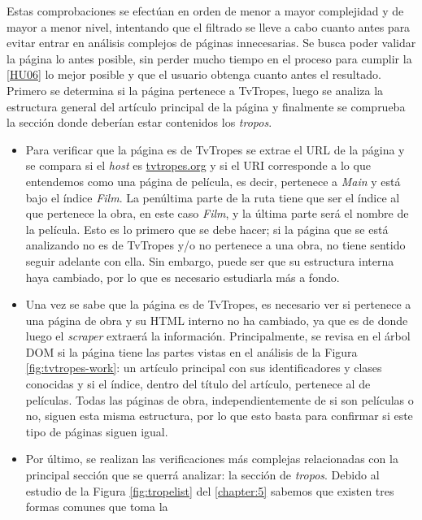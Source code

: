 Estas comprobaciones se efectúan en orden de menor a mayor complejidad y de
mayor a menor nivel, intentando que el filtrado se lleve a cabo cuanto antes
para evitar entrar en análisis complejos de páginas innecesarias. Se busca poder
validar la página lo antes posible, sin perder mucho tiempo en el proceso para
cumplir la \href{https://github.com/jlgallego99/TropesToGo/issues/45}{[HU06]} lo
mejor posible y que el usuario obtenga cuanto antes el resultado. Primero se
determina si la página pertenece a TvTropes, luego se analiza la estructura
general del artículo principal de la página y finalmente se comprueba la sección
donde deberían estar contenidos los \textit{tropos}.
\begin{itemize}
    \item Para verificar que la página es de TvTropes se extrae el URL de la
    página y se compara si el \textit{host} es \url{tvtropes.org} y si el URI
    corresponde a lo que entendemos como una página de película, es decir,
    pertenece a \textit{Main} y está bajo el índice \textit{Film}. La penúltima
    parte de la ruta tiene que ser el índice al que pertenece la obra, en este
    caso \textit{Film}, y la última parte será el nombre de la película. Esto es
    lo primero que se debe hacer; si la página que se está analizando no es de
    TvTropes y/o no pertenece a una obra, no tiene sentido seguir adelante con
    ella. Sin embargo, puede ser que su estructura interna haya cambiado, por lo
    que es necesario estudiarla más a fondo.
    \item Una vez se sabe que la página es de TvTropes, es necesario ver si
    pertenece a una página de obra y su HTML interno no ha cambiado, ya que es
    de donde luego el \textit{scraper} extraerá la información. Principalmente,
    se revisa en el árbol DOM si la página tiene las partes vistas en el
    análisis de la Figura \ref{fig:tvtropes-work}: un artículo principal con sus
    identificadores y clases conocidas y si el índice, dentro del título del
    artículo, pertenece al de películas. Todas las páginas de obra,
    independientemente de si son películas o no, siguen esta misma estructura,
    por lo que esto basta para confirmar si este tipo de páginas siguen igual.
    \item Por último, se realizan las verificaciones más complejas relacionadas
    con la principal sección que se querrá analizar: la sección de
    \textit{tropos}. Debido al estudio de la Figura \ref{fig:tropelist} del
    \autoref{chapter:5} sabemos que existen tres formas comunes que toma la

\end{itemize}
